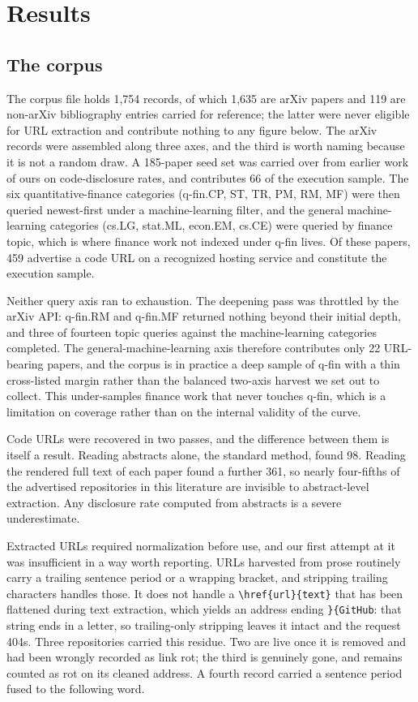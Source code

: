 \section{Results}\label{sec:results}

\subsection{The corpus}\label{sec:corpus}

The corpus file holds 1,754 records, of which 1,635 are arXiv papers and 119 are
non-arXiv bibliography entries carried for reference; the latter were never
eligible for URL extraction and contribute nothing to any figure below. The
arXiv records were assembled along three axes, and the third is worth naming
because it is not a random draw. A 185-paper seed set was carried over from
earlier work of ours on code-disclosure rates, and contributes 66 of the
execution sample. The six quantitative-finance categories (q-fin.CP, ST, TR, PM,
RM, MF) were then queried newest-first under a machine-learning filter, and the
general machine-learning categories (cs.LG, stat.ML, econ.EM, cs.CE) were queried
by finance topic, which is where finance work not indexed under q-fin lives. Of
these papers, 459 advertise a code URL on a recognized hosting service and
constitute the execution sample.

Neither query axis ran to exhaustion. The deepening pass was throttled by the
arXiv API: q-fin.RM and q-fin.MF returned nothing beyond their initial depth, and
three of fourteen topic queries against the machine-learning categories
completed. The general-machine-learning axis therefore contributes only 22
URL-bearing papers, and the corpus is in practice a deep sample of q-fin with a
thin cross-listed margin rather than the balanced two-axis harvest we set out to
collect. This under-samples finance work that never touches q-fin, which is a
limitation on coverage rather than on the internal validity of the curve.

Code URLs were recovered in two passes, and the difference between them is
itself a result. Reading abstracts alone, the standard method, found 98. Reading
the rendered full text of each paper found a further 361, so nearly four-fifths
of the advertised repositories in this literature are invisible to
abstract-level extraction. Any disclosure rate computed from abstracts is a
severe underestimate.

Extracted URLs required normalization before use, and our first attempt at it
was insufficient in a way worth reporting. URLs harvested from prose routinely
carry a trailing sentence period or a wrapping bracket, and stripping trailing
characters handles those. It does not handle a \verb|\href{url}{text}| that has
been flattened during text extraction, which yields an address ending
\verb|}{GitHub|: that string ends in a letter, so trailing-only stripping leaves
it intact and the request 404s. Three repositories carried this residue. Two are
live once it is removed and had been wrongly recorded as link rot; the third is
genuinely gone, and remains counted as rot on its cleaned address. A fourth
record carried a sentence period fused to the following word.

